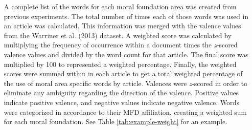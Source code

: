 \documentclass[
  man,floatsintext]{apa6}
\begin{document}
A complete list of the words for each moral foundation area was created from previous experiments. The total number of times each of those words was used in an article was calculated. This information was merged with the valence values from the Warriner et al. (2013) dataset. A weighted score was calculated by multiplying the frequency of occurrence within a document times the \emph{z}-scored valence values and divided by the word count for that article. The final score was multiplied by 100 to represented a weighted percentage. Finally, the weighted scores were summed within in each article to get a total weighted percentage of the use of moral area specific words by article. Valences were \emph{z}-scored in order to eliminate any ambiguity regarding the direction of the valence. Positive values indicate positive valence, and negative values indicate negative valence. Words were categorized in accordance to their MFD affiliation, creating a weighted sum for each moral foundation. See Table \ref{tab:example-weight} for an example.
\end{document}
